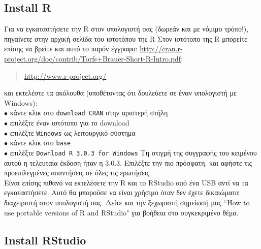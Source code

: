 \documentclass[a4paper,11pt,twocolumn,tablecaptionabove]{scrartcl}
\makeatletter
\let\SF@@footnote\footnote
\def\footnote{\ifx\protect\@typeset@protect
 \expandafter\SF@@footnote
 \else
 \expandafter\SF@gobble@opt
 \fi
}
\edef\SF@gobble@opt{\noexpand\protect
 \expandafter\noexpand\csname SF@gobble@opt \endcsname}
\makeatother
\begin{document}
\subsection{Install R}

Για να εγκαταστήσετε την R στον υπολογιστή σας (δωρεάν και με νόμιμο τρόπο!), πηγαίνετε στην
αρχική σελίδα του ιστοτόπου της R\footnote{Στον ιστότοπο της R μπορείτε επίσης να βρείτε και αυτό το παρόν έγγραφο: \url{http://cran.r-project.org/doc/contrib/Torfs+Brauer-Short-R-Intro.pdf}}:
\begin{quote}
  \url{http://www.r-project.org/}
\end{quote}
και εκτελέστε τα ακόλουθα (υποθέτοντας ότι δουλεύετε σε έναν υπολογιστή με Windows):\\
\noindent $\bullet$ κάντε κλικ στο \texttt{download CRAN} στην αριστερή στήλη\\
\noindent $\bullet$ επιλέξτε έναν ιστότοπο  για το download\\
\noindent $\bullet$ επιλέξτε \texttt{Windows} ως λειτουργικό σύστημα\\
\noindent $\bullet$ κάντε κλικ στο \texttt{base}\\
\noindent $\bullet$ επιλέξτε \texttt{Download R 3.0.3 for Windows} \footnote{Τη στιγμή της
συγγραφής του κειμένου αυτού η τελευταία έκδοση ήταν η 3.0.3. Επιλέξτε την πιο πρόσφατη.} και
αφήστε τις προεπιλεγμένες απαντήσεις σε όλες τις ερωτήσεις\\

Είναι επίσης πιθανό να εκτελέσετε την R και το RStudio από ένα USB αντί να τα εγκαταστήσετε. Αυτό
θα μπορούσε να είναι χρήσιμο όταν δεν έχετε δικαιώματα διαχειριστή στον υπολογιστή σας. Δείτε και 
την ξεχωριστή σημείωσή μας ``How to use portable versions of R and RStudio" για βοήθεια στο 
συγκεκριμένο θέμα.

\subsection{Install RStudio}
\end{document}
